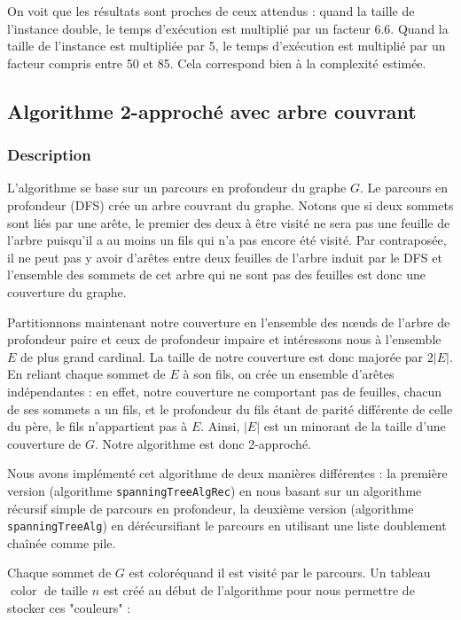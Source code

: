 \documentclass[a4paper,10pt]{article}
\DeclareMathOperator{\Color}{color}
\begin{document}
On voit que les résultats sont proches de ceux attendus : quand la taille de l'instance double, le temps d'exécution est multiplié par un facteur 6.6. Quand la taille de l'instance est multipliée par 5, le temps d'exécution est multiplié par un facteur compris entre 50 et 85. Cela correspond bien à la complexité estimée.

\subsection{Algorithme 2-approché avec arbre couvrant}

\subsubsection{Description}

L'algorithme se base sur un parcours en profondeur du graphe $G$. Le parcours en profondeur (DFS) crée un arbre couvrant du graphe. Notons que si deux sommets sont liés par une arête, le premier des deux à être visité ne sera pas une feuille de l'arbre puisqu'il a au moins un fils qui n'a pas encore été visité. Par contraposée, il ne peut pas y avoir d'arêtes entre deux feuilles de l'arbre induit par le DFS et l'ensemble des sommets de cet arbre qui ne sont pas des feuilles est donc une couverture du graphe. 

Partitionnons maintenant notre couverture en l'ensemble des nœuds de l'arbre de profondeur paire et ceux de profondeur impaire et intéressons nous à l'ensemble $E$ de plus grand cardinal. La taille de notre couverture est donc majorée par $2|E|$. En reliant chaque sommet de $E$ à son fils, on crée un ensemble d'arêtes indépendantes : en effet, notre couverture ne comportant pas de feuilles, chacun de ses sommets a un fils, et le profondeur du fils étant de parité différente de celle du père, le fils n'appartient pas à $E$. Ainsi, $|E|$ est un minorant de la taille d'une couverture de $G$. Notre algorithme est donc 2-approché.

\bigskip
Nous avons implémenté cet algorithme de deux manières différentes : la première version (algorithme \texttt{spanningTreeAlgRec}) en nous basant sur un algorithme récursif simple de parcours en profondeur, la deuxième version (algorithme \texttt{spanningTreeAlg}) en dérécursifiant le parcours en utilisant une liste doublement chaînée comme pile.

Chaque sommet de $G$ est \og coloré\fg quand il est visité par le parcours. Un tableau $\Color$ de taille $n$ est créé au début de l'algorithme pour nous permettre de stocker ces "couleurs" : 
\end{document}
